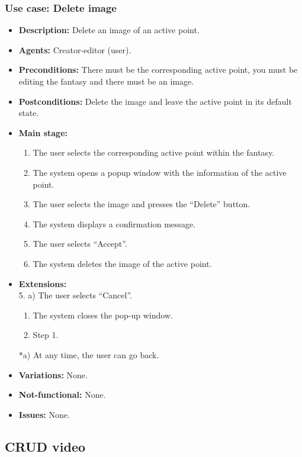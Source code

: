 \subsubsection{Use case: Delete image}
\begin{itemize}
	\item \textbf{Description:} Delete an image of an active point.
	\item \textbf{Agents:} Creator-editor (user).
	\item \textbf{Preconditions:} There must be the corresponding active point, you must be editing the fantasy and there must be an image.
	\item \textbf{Postconditions:} Delete the image and leave the active point in its default state.
	\item \textbf{Main stage:}
	\begin{enumerate}
		\item The user selects the corresponding active point within the fantasy.
		\item The system opens a popup window with the information of the active point.
		\item The user selects the image and presses the ``Delete'' button.
		\item The system displays a confirmation message.
		\item The user selects ``Accept''.
		\item The system deletes the image of the active point.
	\end{enumerate}
	\item \textbf{Extensions:} \\ 5. a) The user selects ``Cancel''.
	\begin{enumerate}
		\item The system closes the pop-up window.
		\item Step 1.
	\end{enumerate}
	*a) At any time, the user can go back.
	\item \textbf{Variations:} None.
	\item \textbf{Not-functional:} None.
	\item \textbf{Issues:} None.
\end{itemize}

\subsection{CRUD video}
\hypertarget{crearvideo}{}
